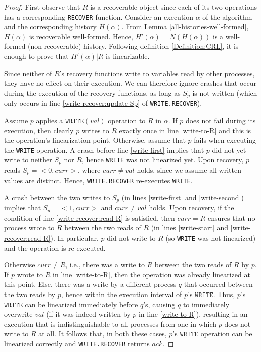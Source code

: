 \begin{proof}
First observe that $R$ is a recoverable object since each of its two operations has a corresponding \texttt{RECOVER} function. Consider an execution $\alpha$ of the algorithm and the corresponding history $H(\alpha)$. From Lemma \ref{all-histories-well-formed}, $H(\alpha)$ is recoverable well-formed. Hence, $H'(\alpha)=N(H(\alpha))$ is a well-formed (non-recoverable) history. Following definition \ref{Definition:CRL}, it is enough to prove that $H'(\alpha) | R$ is  linearizable.
	
Since neither of $R$'s recovery functions write to variables read by other processes, they have no effect on their execution. We can therefore ignore crashes that occur during the execution of the recovery functions, as long as $S_p$ is not written (which only occurs in line \ref{write-recover:update-Sp} of \texttt{WRITE.RECOVER}).

Assume $p$ applies a $\texttt{WRITE}(val)$ operation to $R$ in $\alpha$. If $p$ does not fail during its execution, then clearly $p$ writes to $R$ exactly once in line \ref{write-to-R} and this is the operation's linearization point. Otherwise, assume that $p$ fails when executing the \texttt{WRITE} operation. A crash before line \ref{write-first} implies that $p$ did not yet write to neither $S_p$ nor $R$, hence \texttt{WRITE} was not linearized yet. Upon recovery, $p$ reads $S_p={<}0,curr{>}$, where $curr \neq val$ holds, since we assume all written values are distinct. Hence, \texttt{WRITE.RECOVER} re-executes \texttt{WRITE}.

A crash between the two writes to $S_p$ (in lines \ref{write-first} and \ref{write-second}) implies that $S_p={<}1,curr{>}$ and $curr \neq val$ holds. Upon recovery, if the condition of line \ref{write-recover:read-R} is satisfied, then $curr = R$ ensures that no process wrote to $R$ between the two reads of $R$ (in lines \ref{write-start} and \ref{write-recover:read-R}). In particular, $p$ did not write to $R$ (so \texttt{WRITE} was not linearized) and the operation is re-executed.

Otherwise $curr \neq R$, i.e., there was a write to $R$ between the two reads of $R$ by $p$. If $p$ wrote to $R$ in line \ref{write-to-R}, then the operation was already linearized at this point. Else, there was a write by a different process $q$ that occurred between the two reads by $p$, hence within the execution interval of $p$'s $\texttt{WRITE}$. Thus, $p$'s $\texttt{WRITE}$ can be linearized immediately before $q$'s, causing $q$ to immediately overwrite $val$ (if it was indeed written by $p$ in line \ref{write-to-R}), resulting in an execution that is indistinguishable to all processes from one in which $p$ does not write to $R$ at all. It follows that, in both these cases, $p$'s $\texttt{WRITE}$ operation can be linearized correctly and \texttt{WRITE.RECOVER} returns $ack$.


\end{proof}
